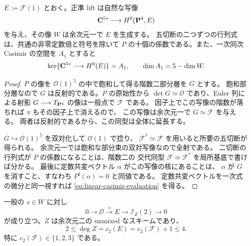 \begin{lemma}
\label{lem:canonical-five-sections}
$E:=\mathcal F(1)$ とおく。正準 lift は自然な写像
\[
 \mathbf C^{5*}\longrightarrow H^0(\mathbf P^4,E)
\]
を与え、その像 $W$ は余次元一で $E$ を生成する。
五切断の二つずつの行列式は、共通の非零定数倍と符号を除いて
$P$ の十個の係数である。また、一次同次 Casimir の空間を $A_1$ とすると
\begin{equation}
 \ker\{\mathbf C^{5*}\longrightarrow H^0(E)\}=A_1,
 \qquad \dim A_1=5-\dim W.
 \label{eq:linear-casimir-evaluation}
\end{equation}
\end{lemma}

\begin{proof}
$P$ の像を $\mathcal O(1)^5$ の中で飽和して得る階数二部分層を $G$ とする。
飽和部分層なので $G$ は反射的である。$P$ の原始性から
$\det G\simeq\mathcal O$ であり、Euler 列による射影
$G\longrightarrow T_{\mathbf P^4}$ の像は一般点で $\mathcal F$ である。
因子上でこの写像の階数が落ちれば $\pi$ もその因子上で消えるので、
この写像は余次元一で $G\simeq\mathcal F$ を与える。
両者は反射的であるから、この同型は全体に延長する。

$G\hookrightarrow\mathcal O(1)^5$ を双対化して $\mathcal O(1)$ で捻り、
$\mathcal F^*\simeq\mathcal F$ を用いると所要の五切断が得られる。
余次元一では飽和な部分束の双対写像なので全射である。
二切断の行列式が $P$ の係数になることは、階数二の
交代同型 $\mathcal F\simeq\mathcal F^*$ を局所基底で書けば分かる。
最後に定数共変ベクトル $\alpha$ がこの写像の核にあることは、
$\alpha$ が $G$ を消すこと、すなわち $P^\sharp(\alpha)=0$ と同値である。
定数共変ベクトルを一次式の微分と同一視すれば
\eqref{eq:linear-casimir-evaluation} を得る。
\end{proof}

\begin{lemma}
\label{lem:chern-bound-stable-rank-two}
一般の $s\in W$ に対し
\begin{equation}
 0\longrightarrow\mathcal O\xrightarrow{s}E
 \longrightarrow\mathcal I_Z(2)\longrightarrow0
 \label{eq:section-extension}
\end{equation}
が成り立つ。$Z$ は余次元二の unmixed なスキームであり、
\begin{equation}
 2\leq\deg Z=c_2(E)=c_2(\mathcal F)+1\leq4.
 \label{eq:chern-bound}
\end{equation}
特に $c_2(\mathcal F)\in\{1,2,3\}$ である。
\end{lemma}

